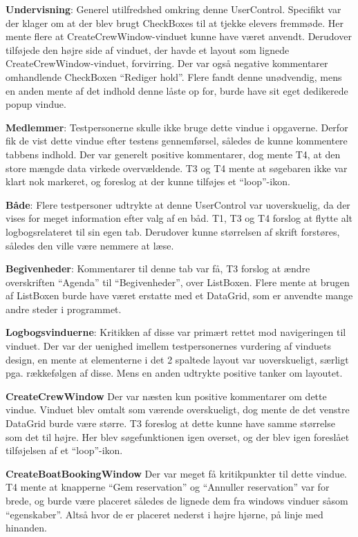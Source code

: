 \textbf{Undervisning}: 
Generel utilfredshed omkring denne UserControl.
Specifikt var der klager om at der blev brugt CheckBoxes til at tjekke elevers fremmøde. 
Her mente flere at CreateCrewWindow-vinduet kunne have været anvendt. 
Derudover tilføjede den højre side af vinduet, der havde et layout som lignede CreateCrewWindow-vinduet, forvirring. 
Der var også negative kommentarer omhandlende CheckBoxen ``Rediger hold''. 
Flere fandt denne unødvendig, mens en anden mente af det indhold denne låste op for, burde have sit eget dedikerede popup vindue.

\textbf{Medlemmer}:
Testpersonerne skulle ikke bruge dette vindue i opgaverne.
Derfor fik de vist dette vindue efter testens gennemførsel, således de kunne kommentere tabbens indhold. 
Der var generelt positive kommentarer, dog mente T4, at den store mængde data virkede overvældende. 
T3 og T4 mente at søgebaren ikke var klart nok markeret, og foreslog at der kunne tilføjes et ``loop''-ikon. 

\textbf{Både}:
Flere testpersoner udtrykte at denne UserControl var uoverskuelig, da der vises for meget information efter valg af en båd.
T1, T3 og T4 forslog at flytte alt logbogsrelateret til sin egen tab.
Derudover kunne størrelsen af skrift forstøres, således den ville være nemmere at læse. 

\textbf{Begivenheder}:
Kommentarer til denne tab var få, T3 forslog at ændre overskriften ``Agenda'' til ``Begivenheder'', over ListBoxen.
Flere mente at brugen af ListBoxen burde have været erstatte med et DataGrid, som er anvendte mange andre steder i programmet. 

\textbf{Logbogsvinduerne}:
Kritikken af disse var primært rettet mod navigeringen til vinduet. 
Der var der uenighed imellem testpersonernes vurdering af vinduets design, en mente at elementerne i det 2 spaltede layout var uoverskueligt, særligt pga. rækkefølgen af disse. 
Mens en anden udtrykte positive tanker om layoutet.

\textbf{CreateCrewWindow}
Der var næsten kun positive kommentarer om dette vindue.
Vinduet blev omtalt som værende overskueligt, dog mente de det venstre DataGrid burde være større.
T3 foreslog at dette kunne have samme størrelse som det til højre. 
Her blev søgefunktionen igen overset, og der blev igen foreslået tilføjelsen af et ``loop''-ikon.

\textbf{CreateBoatBookingWindow}
Der var meget få kritikpunkter til dette vindue.
T4 mente at knapperne ``Gem reservation'' og ``Annuller reservation'' var for brede, og burde være placeret således de lignede dem fra windows vinduer såsom ``egenskaber''. 
Altså hvor de er placeret nederst i højre hjørne, på linje med hinanden. 

